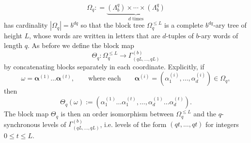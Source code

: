 \documentclass[11pt]{amsart}
\newcommand\labs[1]{\left\lvert#1\right\rvert}
\renewcommand{\leq}{\leqslant}
\theoremstyle{plain}
\theoremstyle{definition}
\theoremstyle{remark}
\begin{document}
\[ \Omega_q: = \underbrace{(\Lambda_b^q)\times \cdots \times (\Lambda_b^q)}_{d \text{ times}}\]
has cardinality $\labs{\Omega_q} = b^{dq}$ so that the block tree $\Omega_q^{\leq L}$ is a complete $b^{dq}$-ary tree of height $L$, whose words are written in letters that are $d$-tuples of $b$-ary words of length $q$. As before we define the block map
\[ \Theta_q: \Omega_q ^{\leq L} \to \Gamma_{(qL,\ldots,qL)}^{(b)}\]
by concatenating blocks separately in each coordinate. Explicitly, if
\[ \omega = \bm{\alpha}^{(1)}\ldots\bm{\alpha}^{(t)}, \qquad \text{where each} \qquad \bm{\alpha}^{(i)} = \left(\alpha_1^{(i)},\ldots,\alpha_d^{(i)}\right) \in \Omega_q,\]
then
\[ \Theta_q(\omega) := \left(\alpha_1^{(1)}\ldots \alpha_1^{(t)}, \ldots,\alpha_d^{(1)}\ldots \alpha_d^{(t)}\right).\]
The block map $\Theta_q$ is then an order isomorphism between $\Omega_q^{\leq L}$ and the $q$-synchronous levels of $\Gamma_{(qL,\ldots,qL)}^{(b)}$, i.e. levels of the form $(qt,\ldots,qt)$ for integers $0\leq t \leq L$.
\end{document}
